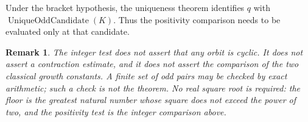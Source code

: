 \documentclass[11pt,letterpaper]{article}
\newtheorem{remark}[theorem]{Remark}
\begin{document}
Under the bracket hypothesis, the uniqueness theorem identifies \(q\) with
\(\operatorname{UniqueOddCandidate}(K)\). Thus the positivity comparison
needs to be evaluated only at that candidate.

\begin{remark}
The integer test does not assert that any orbit is cyclic. It does not assert
a contraction estimate, and it does not assert the comparison of the two
classical growth constants. A finite set of odd pairs may be checked by exact
arithmetic; such a check is not the theorem. No real square root is required:
the floor is the greatest natural number whose square does not exceed the
power of two, and the positivity test is the integer comparison above.
\end{remark}
\end{document}
